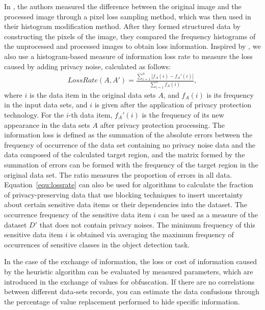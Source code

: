 \documentclass[trans]{IEEEtran}
\begin{document}
In \cite{tai2009reversible}, the authors measured the difference between the original image and the processed image through a pixel loss sampling method, which was then used in their histogram modification method. After they formed structured data by constructing the pixels of the image, they compared the frequency histograms of the unprocessed and processed images to obtain loss information.
Inspired by \cite{tai2009reversible}, we also use a histogram-based measure of information loss rate to measure the loss caused by adding privacy noise, calculated as follows:
\begin{eqnarray} \label{equ:lossrate}
LossRate(A,A')= \frac{\sum_{i=1}^n |f_A (i)-f_A' (i)|}{ \sum_{i=1}^n f_A (i)},
\end{eqnarray}
where $i$ is the data item in the original data sets $A$, and $ f_A (i) $ is its frequency in the input data sets, and $i$ is given after the application of privacy protection technology. For the $i$-th data item, $ f_A '(i) $ is the frequency of its new appearance in the data sets $A$ after privacy protection processing. 
The information loss is defined as the summation of the absolute errors between the frequency of occurrence of the data set containing no privacy noise data and the data composed of the calculated target region, and the matrix formed by the summation of errors can be formed with the frequency of the target region in the original data set. The ratio measures the proportion of errors in all data. Equation~\eqref{equ:lossrate} can also be used for algorithms to calculate the fraction of privacy-preserving data that use blocking techniques to insert uncertainty about certain sensitive data items or their dependencies into the dataset. The occurrence frequency of the sensitive data item $i$ can be used as a measure of the dataset $D'$ that does not contain privacy noises.
The minimum frequency of this sensitive data item $i$ is obtained via averaging the maximum frequency of occurrences of sensitive classes in the object detection task.

In the case of the exchange of information, the loss or cost of information caused by the heuristic algorithm can be evaluated by measured parameters, which are introduced in the exchange of values for obfuscation. If there are no correlations between different data-sets records, you can estimate the data confusions through the percentage of value replacement performed to hide specific information.
\end{document}
